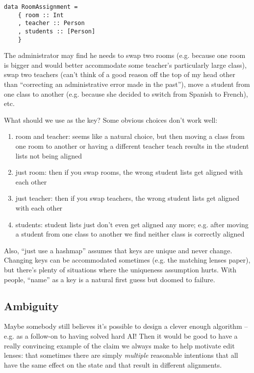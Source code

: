 \begin{verbatim}
data RoomAssignment =
    { room :: Int
    , teacher :: Person
    , students :: [Person]
    }
\end{verbatim}

The administrator may find he needs to swap two rooms (e.g. because one room
is bigger and would better accommodate some teacher's particularly large
class), swap two teachers (can't think of a good reason off the top of my
head other than ``correcting an administrative error made in the past''),
move a student from one class to another (e.g. because she decided to switch
from Spanish to French), etc.

What should we use as the key? Some obvious choices don't work well:
\begin{enumerate}
    \item room and teacher: seems like a natural choice, but then moving a
        class from one room to another or having a different teacher teach
        results in the student lists not being aligned
    \item just room: then if you swap rooms, the wrong student lists get aligned
        with each other
    \item just teacher: then if you swap teachers, the wrong student lists get
        aligned with each other
    \item students: student lists just don't even get aligned any more; e.g.
        after moving a student from one class to another we find neither
        class is correctly aligned
\end{enumerate}

Also, ``just use a hashmap'' assumes that keys are unique and never change.
Changing keys can be accommodated sometimes (e.g. the matching lenses
paper), but there's plenty of situations where the uniqueness assumption
hurts. With people, ``name'' as a key is a natural first guess but doomed to
failure.

\subsection{Ambiguity}
Maybe somebody still believes it's possible to design a clever enough
algorithm -- e.g. as a follow-on to having solved hard AI! Then it would be
good to have a really convincing example of the claim we always make to help
motivate edit lenses: that sometimes there are simply \emph{multiple}
reasonable intentions that all have the same effect on the state and that
result in different alignments.

